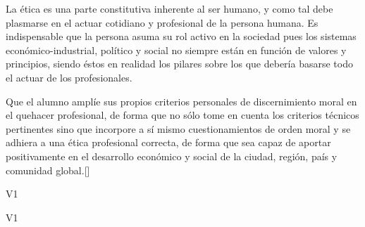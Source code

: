 \begin{syllabus}


\begin{justification}
La ética es una parte constitutiva inherente al ser humano, y como tal debe plasmarse en el actuar cotidiano y profesional de la persona humana. Es indispensable que la persona asuma su rol activo en la sociedad pues los sistemas económico-industrial, político y social no siempre están en función de valores y principios, siendo éstos en realidad los pilares sobre los que debería basarse todo el actuar de los profesionales.
\end{justification}

\begin{goals}
\item Que el alumno amplíe sus propios criterios personales de discernimiento moral en el quehacer profesional, de forma que no sólo tome en cuenta los criterios técnicos pertinentes sino que incorpore a sí mismo cuestionamientos de orden moral y se adhiera a una ética profesional correcta, de forma que sea capaz de aportar positivamente en el desarrollo económico y social de la ciudad, región, país y comunidad global.[\Usage]
\end{goals}

\begin{outcomes}{V1}
    \item {}
    \item {}
	\item {}
\end{outcomes}

\begin{competences}{V1}
    \item {}
    \item {}
    \item {}
    \item {}
\end{competences}


\end{syllabus}
